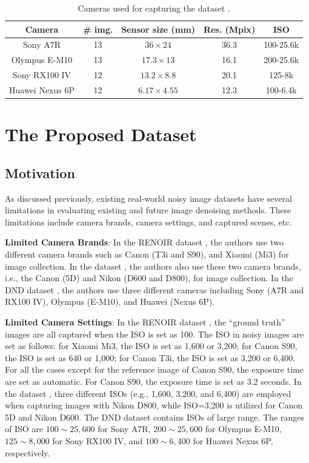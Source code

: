 \begin{table}[ht!]
\caption{Cameras used for capturing the dataset \cite{dnd2017}.}
\vspace{-5mm}
\label{tab6-3}
\begin{center}
\small
\renewcommand\arraystretch{1.2}
\begin{tabular*}{1\textwidth}{@{\extracolsep{\fill}}ccccc}
\hline
Camera
&
\# img.
&
Sensor size (mm)
&
Res. (Mpix)
&
ISO
\\
\hline
Sony A7R & 13  & $36\times24$  & 36.3  & 100-25.6k
\\
\hline
Olympus E-M10 & 13  & $17.3\times13$  & 16.1  & 200-25.6k 
\\
\hline   
Sony RX100 IV & 12 & $13.2\times8.8$  & 20.1  & 125-8k 
\\
\hline   
Huawei Nexus 6P & 12 & $6.17\times4.55$  & 12.3  & 100-6.4k 
\\
\hline
\end{tabular*}
\end{center}
\end{table}


\section{The Proposed Dataset}

\subsection{Motivation}
As discussed previously, existing real-world noisy image datasets \cite{RENOIR2014,crosschannel2016,dnd2017} have several limitations in evaluating existing and future image denoising methods. These limitations include camera brands, camera settings, and captured scenes, etc.

\textbf{Limited Camera Brands}: In the RENOIR dataset \cite{RENOIR2014}, the authors use two different camera brands such as Canon (T3i and S90), and Xiaomi (Mi3) for image collection. In the dataset \cite{crosschannel2016}, the authors also use these two camera brands, i.e., the Canon (5D) and Nikon (D600 and D800), for image collection. In the DND dataset \cite{dnd2017}, the authors use three different cameras including Sony (A7R and RX100 IV),  Olympus (E-M10), and Huawei (Nexus 6P).

\textbf{Limited Camera Settings}: In the RENOIR dataset \cite{RENOIR2014}, the ``ground truth'' images are all captured when the ISO is set as 100. The ISO in noisy images are set as follows: for Xiaomi Mi3, the ISO is set as 1,600 or 3,200; for Canon S90, the ISO is set as 640 or 1,000; for Canon T3i, the ISO is set as 3,200 or 6,400. For all the cases except for the reference image of Canon S90, the exposure time are set as automatic. For Canon S90, the exposure time is set as 3.2 seconds. In the dataset \cite{crosschannel2016}, three different ISOs (e.g., 1,600, 3,200, and 6,400) are employed when capturing images with Nikon D800, while ISO=3,200 is utilized for Canon 5D and Nikon D600. The DND dataset \cite{dnd2017} contains ISOs of large range. The ranges of ISO are $100\sim25,600$ for Sony A7R, $200\sim25,600$ for Olympus E-M10, $125\sim8,000$ for Sony RX100 IV, and $100\sim6,400$ for Huawei Nexus 6P, respectively. 

